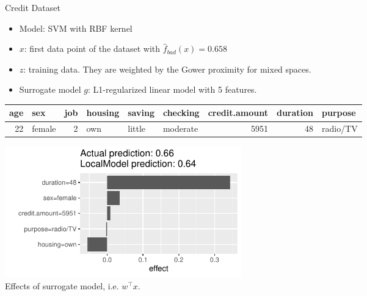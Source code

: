 \documentclass[aspectratio=169]{../latex_main/tntbeamer}  %
\begin{document}
\begin{frame}{Credit Dataset}

\vspace{-1.5em}
	\begin{itemize}
		\item Model: SVM with RBF kernel
		\item $x$: first data point of the dataset with $\hat{f}_{bad}(x) = 0.658$
		\item $z$: training data. They are weighted by the Gower proximity for mixed spaces. 
		\item Surrogate model $g$: L1-regularized linear model with 5 features. 
	\end{itemize}
	\begin{table}[ht]
		\centering
		\scriptsize
		\begin{tabular}{rlrlllrrl}
			\hline
			age & sex & job & housing & saving & checking & credit.amount & duration & purpose \\ 
			\hline
			 22 & female &   2 & own & little & moderate & 5951 &  48 & radio/TV \\ 
			\hline
		\end{tabular}
	\end{table}
\begin{center}
	\includegraphics[width=0.45\textwidth]{figure/lime_credit.pdf}\\[-0.4em]
	Effects of surrogate model, i.e. $w^\top x$.
\end{center}

\end{frame}
\end{document}
